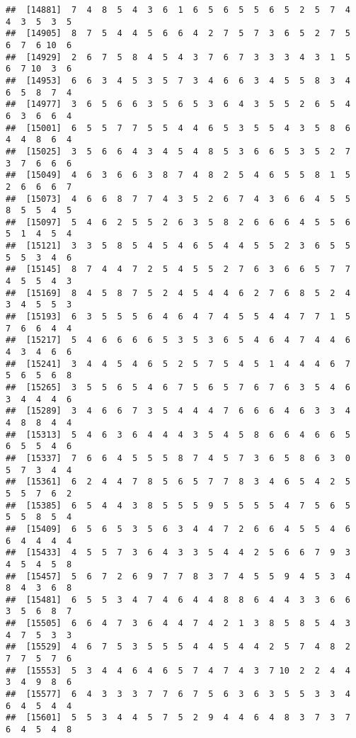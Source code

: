 \documentclass[
]{book}
\begin{document}
\begin{verbatim}
##  [14881]  7  4  8  5  4  3  6  1  6  5  6  5  5  6  5  2  5  7  4  4  3  5  3  5
##  [14905]  8  7  5  4  4  5  6  6  4  2  7  5  7  3  6  5  2  7  5  6  7  6 10  6
##  [14929]  2  6  7  5  8  4  5  4  3  7  6  7  3  3  3  4  3  1  5  6  7 10  3  6
##  [14953]  6  6  3  4  5  3  5  7  3  4  6  6  3  4  5  5  8  3  4  6  5  8  7  4
##  [14977]  3  6  5  6  6  3  5  6  5  3  6  4  3  5  5  2  6  5  4  6  3  6  6  4
##  [15001]  6  5  5  7  7  5  5  4  4  6  5  3  5  5  4  3  5  8  6  4  4  8  6  4
##  [15025]  3  5  6  6  4  3  4  5  4  8  5  3  6  6  5  3  5  2  7  3  7  6  6  6
##  [15049]  4  6  3  6  6  3  8  7  4  8  2  5  4  6  5  5  8  1  5  2  6  6  6  7
##  [15073]  4  6  6  8  7  7  4  3  5  2  6  7  4  3  6  6  4  5  5  8  5  5  4  5
##  [15097]  5  4  6  2  5  5  2  6  3  5  8  2  6  6  6  4  5  5  6  5  1  4  5  4
##  [15121]  3  3  5  8  5  4  5  4  6  5  4  4  5  5  2  3  6  5  5  5  5  3  4  6
##  [15145]  8  7  4  4  7  2  5  4  5  5  2  7  6  3  6  6  5  7  7  4  5  5  4  3
##  [15169]  8  4  5  8  7  5  2  4  5  4  4  6  2  7  6  8  5  2  4  3  4  5  5  3
##  [15193]  6  3  5  5  5  6  4  6  4  7  4  5  5  4  4  7  7  1  5  7  6  6  4  4
##  [15217]  5  4  6  6  6  6  5  3  5  3  6  5  4  6  4  7  4  4  6  4  3  4  6  6
##  [15241]  3  4  4  5  4  6  5  2  5  7  5  4  5  1  4  4  4  6  7  5  6  5  6  8
##  [15265]  3  5  5  6  5  4  6  7  5  6  5  7  6  7  6  3  5  4  6  3  4  4  4  6
##  [15289]  3  4  6  6  7  3  5  4  4  4  7  6  6  6  4  6  3  3  4  4  8  8  4  4
##  [15313]  5  4  6  3  6  4  4  4  3  5  4  5  8  6  6  4  6  6  5  6  5  5  4  6
##  [15337]  7  6  6  4  5  5  5  8  7  4  5  7  3  6  5  8  6  3  0  5  7  3  4  4
##  [15361]  6  2  4  4  7  8  5  6  5  7  7  8  3  4  6  5  4  2  5  5  5  7  6  2
##  [15385]  6  5  4  4  3  8  5  5  5  9  5  5  5  5  4  7  5  6  5  5  5  8  5  4
##  [15409]  6  5  6  5  3  5  6  3  4  4  7  2  6  6  4  5  5  4  6  6  4  4  4  4
##  [15433]  4  5  5  7  3  6  4  3  3  5  4  4  2  5  6  6  7  9  3  4  5  4  5  8
##  [15457]  5  6  7  2  6  9  7  7  8  3  7  4  5  5  9  4  5  3  4  8  4  3  6  8
##  [15481]  6  5  5  3  4  7  4  6  4  4  8  8  6  4  4  3  3  6  6  3  5  6  8  7
##  [15505]  6  6  4  7  3  6  4  4  7  4  2  1  3  8  5  8  5  4  3  4  7  5  3  3
##  [15529]  4  6  7  5  3  5  5  5  4  4  5  4  4  2  5  7  4  8  2  7  7  5  7  6
##  [15553]  5  3  4  4  6  4  6  5  7  4  7  4  3  7 10  2  2  4  4  3  4  9  8  6
##  [15577]  6  4  3  3  3  7  7  6  7  5  6  3  6  3  5  5  3  3  4  6  4  5  4  4
##  [15601]  5  5  3  4  4  5  7  5  2  9  4  4  6  4  8  3  7  3  7  6  4  5  4  8

\end{verbatim}
\end{document}
